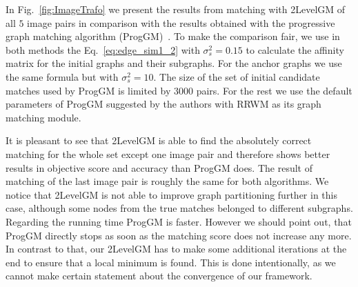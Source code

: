 In Fig.~\ref{fig:ImageTrafo} we present the results from matching with 2LevelGM of all $5$ image pairs in comparison with the results obtained with the progressive graph matching algorithm (ProgGM)~\cite{Cho2012_ProgressiveGM}. %
To make the comparison fair, we use in both methods the Eq.~\eqref{eq:edge_sim1_2} with $\sigma_s^2=0.15$ to calculate the affinity matrix for the initial graphs and their subgraphs. For the anchor graphs we use the same formula but with $\sigma^2_s=10$. The size of the set of initial candidate matches used by ProgGM is limited by $3000$ pairs. For the rest we use the default parameters of ProgGM suggested by the authors with RRWM as its graph matching module.

It is pleasant to see that 2LevelGM is able to find the absolutely correct matching for the whole set except one image pair and therefore shows better results in objective score and accuracy than ProgGM does. The result of matching of the last image pair is roughly the same for both algorithms. We notice that 2LevelGM is not able to improve graph partitioning further in this case, although some nodes from the true matches belonged to different subgraphs. Regarding the running time ProgGM is faster. However we should point out, that ProgGM directly stops as soon as the matching score does not increase any more. In contrast to that, our 2LevelGM has to make some additional iterations at the end to ensure that a local minimum is found. This is done intentionally, as we cannot make certain statement about the convergence of our framework.

